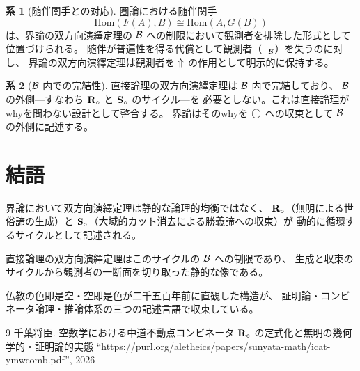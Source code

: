 \documentclass[11pt,a4paper]{ltjsarticle}
\theoremstyle{definition}
\newtheorem{corollary}{系}[section]
\begin{document}
\begin{corollary}[随伴関手との対応]
圏論における随伴関手
\[
\mathrm{Hom}(F(A), B) \cong \mathrm{Hom}(A, G(B))
\]
は、界論の双方向演繹定理の $\mathcal{B}$ への制限において観測者を排除した形式として位置づけられる。
随伴が普遍性を得る代償として観測者（$\vdash_{\mathcal{B}}$）を失うのに対し、
界論の双方向演繹定理は観測者を $\Uparrow$ の作用として明示的に保持する。
\end{corollary}

\begin{corollary}[$\mathcal{B}$ 内での完結性]
直接論理の双方向演繹定理は $\mathcal{B}$ 内で完結しており、
$\mathcal{B}$ の外側---すなわち $\mathbf{R}_{\circ}$ と $\mathbf{S}_{\circ}$ のサイクル---を
必要としない。これは直接論理がwhyを問わない設計として整合する。
界論はそのwhyを $\bigcirc$ への収束として $\mathcal{B}$ の外側に記述する。
\end{corollary}

\section{結語}

界論において双方向演繹定理は静的な論理的均衡ではなく、
$\mathbf{R}_{\circ}$（無明による世俗諦の生成）と
$\mathbf{S}_{\circ}$（大域的カット消去による勝義諦への収束）が
動的に循環するサイクルとして記述される。

直接論理の双方向演繹定理はこのサイクルの $\mathcal{B}$ への制限であり、
生成と収束のサイクルから観測者の一断面を切り取った静的な像である。

仏教の色即是空・空即是色が二千五百年前に直観した構造が、
証明論・コンビネータ論理・推論体系の三つの記述言語で収束している。

\begin{thebibliography}{9}
千葉将臣.
\newblock 空数学における中道不動点コンビネータ $\mathbf{R}_{\circ}$ の定式化と無明の幾何学的・証明論的実態
\newblock ``https://purl.org/aletheics/papers/sunyata-math/icat-ymwcomb.pdf'', 2026
\end{thebibliography}
\end{document}
